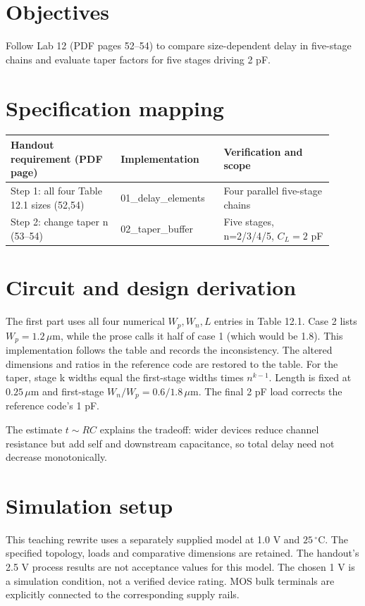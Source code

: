 \section{Objectives}
Follow Lab 12 (PDF pages 52--54) to compare size-dependent delay in five-stage chains and evaluate taper factors for five stages driving 2 pF.

\section{Specification mapping}
\begin{longtable}{p{0.31\linewidth}p{0.29\linewidth}p{0.31\linewidth}}
\toprule
Handout requirement (PDF page) & Implementation & Verification and scope \\\midrule
Step 1: all four Table 12.1 sizes (52,54) & 01\_delay\_elements & Four parallel five-stage chains \\
Step 2: change taper n (53--54) & 02\_taper\_buffer & Five stages, n=2/3/4/5, $C_L=2$ pF \\
\bottomrule
\end{longtable}


\section{Circuit and design derivation}
The first part uses all four numerical $W_p,W_n,L$ entries in Table 12.1. Case 2 lists $W_p=1.2\,\mu$m, while the prose calls it half of case 1 (which would be 1.8). This implementation follows the table and records the inconsistency. The altered dimensions and ratios in the reference code are restored to the table. For the taper, stage k widths equal the first-stage widths times $n^{k-1}$. Length is fixed at $0.25\,\mu$m and first-stage $W_n/W_p=0.6/1.8\,\mu$m. The final 2 pF load corrects the reference code's 1 pF.

The estimate $t\sim RC$ explains the tradeoff: wider devices reduce channel resistance but add self and downstream capacitance, so total delay need not decrease monotonically.

\section{Simulation setup}
This teaching rewrite uses a separately supplied model at 1.0 V and $25\,^{\circ}\mathrm C$. The specified topology, loads and comparative dimensions are retained. The handout's 2.5 V process results are not acceptance values for this model. The chosen 1 V is a simulation condition, not a verified device rating. MOS bulk terminals are explicitly connected to the corresponding supply rails.

